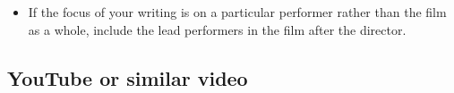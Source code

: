 \begin{itemize}\item If the focus of your writing is on a particular performer rather than the film as a whole, include the lead performers in the film after the director. \end{itemize}


\subsection{YouTube or similar video}
\bigskip



